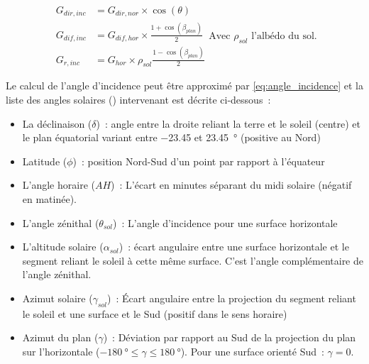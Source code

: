 \begin{equation}\label{eq:rayonnement_surf_incline}
    \begin{aligned}
        G_{dir, inc} &= G_{dir, nor} \times \cos(\theta) \\[10pt]
        G_{dif, inc} &= G_{dif, hor} \times \frac{1 + \cos(\beta_{plan})}{2} \\[10pt]
        G_{r, inc}   &= G_{hor} \times \rho_{sol} \frac{1 - \cos(\beta_{plan})}{2}
    \end{aligned}
    \text{Avec $\rho_{sol}$ l’albédo du sol.}
\end{equation}

Le calcul de l’angle d’incidence peut être approximé par \eqref{eq:angle_incidence}
\parencite{Cooper1969333,Duffie1980} et la liste des angles solaires
() intervenant est décrite ci-dessous~:
\begin{itemize}
    \item La déclinaison ($\delta$)~: angle entre la droite reliant la terre et le soleil
          (centre) et le plan équatorial variant entre \num{-23.45} et \SI{23.45}{\degree}
          (positive au Nord)
    \item Latitude ($\phi$)~: position Nord-Sud d’un point par rapport à l’équateur
    \item L’angle horaire ($AH$)~: L’écart en minutes séparant du midi solaire (négatif en matinée).
    \item L’angle zénithal ($\theta_{sol}$)~: L’angle d’incidence pour une surface horizontale
    \item L’altitude solaire ($\alpha_{sol}$)~: écart angulaire entre une surface horizontale et le segment reliant
          le soleil à cette même surface. C’est l’angle complémentaire de l’angle zénithal.
    \item Azimut solaire ($\gamma_{sol}$)~: Écart angulaire entre la projection du segment reliant
          le soleil et une surface et le Sud (positif dans le sens horaire)
    \item Azimut du plan ($\gamma$)~: Déviation par rapport au Sud de la projection
          du plan sur l’horizontale ($\SI{-180}{\degree} \leq \gamma \leq \SI{180}{\degree}$).
          Pour une surface orienté Sud~: $\gamma=0$.
\end{itemize}

